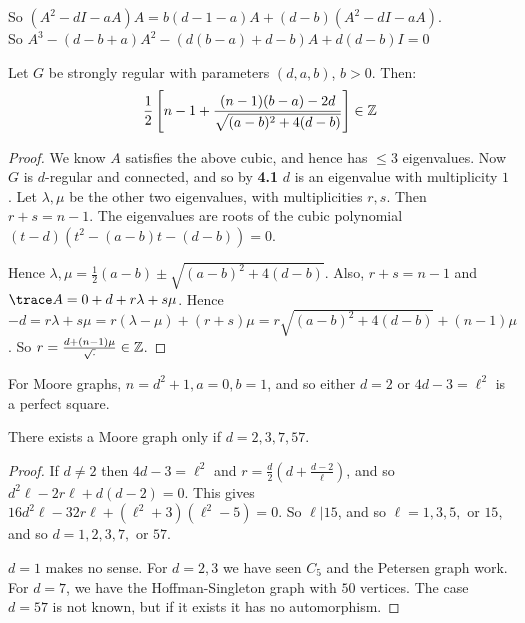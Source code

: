 \documentclass[10pt,a4paper]{article}
\begin{document}
So $(A^2 - dI - aA)A = b(d-1-a)A + (d-b)(A^2 - dI - aA)$.\\
So $A^3 - (d-b+a)A^2 - (d(b-a) + d-b)A + d(d-b)I = 0$
\begin{theorem}
Let $G$ be strongly regular with parameters $(d,a,b)$, $b>0$. Then:
\begin{align*}
\frac{1}{2}\left[ n-1 + \frac{(n-1)(b-a)-2d}{\sqrt{(a-b)^2 + 4(d-b)}}\right] \in \mathbb{Z}
\end{align*}
\end{theorem}
\begin{proof}
We know $A$ satisfies the above cubic, and hence has $\leq 3$ eigenvalues. Now $G$ is $d$-regular and connected, and so by \textbf{4.1} $d$ is an eigenvalue with multiplicity $1$. Let $\lambda, \mu$ be the other two eigenvalues, with multiplicities $r, s$. Then $r+s=n-1$. The eigenvalues are roots of the cubic polynomial $(t-d)(t^2-(a-b)t-(d-b)) = 0$.

Hence $\lambda, \mu = \frac{1}{2}(a-b)\pm \sqrt{(a-b)^2+4(d-b)}$. Also, $r+s = n-1$ and $\trace A = 0 + d + r\lambda + s\mu$. Hence $-d = r\lambda + s\mu = r(\lambda-\mu) + (r+s)\mu = r\sqrt{(a-b)^2 +4(d-b)} + (n-1)\mu$. So $r = \frac{d+(n-1)\mu}{\sqrt{\cdot}} \in \mathbb{Z}$.
\end{proof}

For Moore graphs, $n=d^2 + 1, a=0, b=1$, and so either $d=2$ or $4d-3=\ell^2$ is a perfect square.
\begin{theorem}
There exists a Moore graph only if $d = 2,3,7,57$.
\end{theorem}
\begin{proof}
If $d\neq 2$ then $4d-3 = \ell^2$ and $r = \frac{d}{2}(d+\frac{d-2}{\ell})$, and so $d^2\ell-2r\ell + d(d-2) = 0$. This gives $16d^2\ell - 32 r\ell + (\ell^2+3)(\ell^2-5) = 0$. So $\ell | 15$, and so $\ell =1, 3, 5, $ or $15$, and so $d = 1, 2, 3, 7,$ or $57$.

$d=1$ makes no sense. For $d=2, 3$ we have seen $C_5$ and the Petersen graph work. For $d=7$, we have the Hoffman-Singleton graph with $50$ vertices. The case $d=57$ is not known, but if it exists it has no automorphism.
\end{proof}
\end{document}
